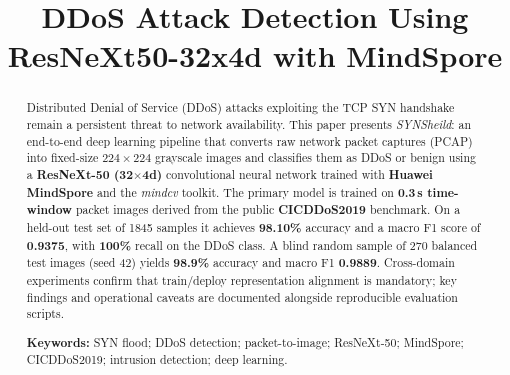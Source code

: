\documentclass[conference]{IEEEtran}
\begin{document}
\title{DDoS Attack Detection Using ResNeXt50-32x4d with MindSpore}

\author{
  \and
  \and
}

\maketitle

\begin{abstract}
Distributed Denial of Service (DDoS) attacks exploiting the TCP SYN handshake
remain a persistent threat to network availability.
This paper presents \textit{SYNSheild}: an end-to-end deep learning pipeline
that converts raw network packet captures (PCAP) into fixed-size $224\times224$
grayscale images and classifies them as DDoS or benign using a
\textbf{ResNeXt-50 (32$\times$4d)} convolutional neural network trained with
\textbf{Huawei MindSpore} and the \textit{mindcv} toolkit.
The primary model is trained on \textbf{0.3\,s time-window} packet images derived
from the public \textbf{CICDDoS2019} benchmark.
On a held-out test set of 1845 samples it achieves \textbf{98.10\%}
accuracy and a macro F1 score of \textbf{0.9375}, with \textbf{100\%} recall on the
DDoS class.
A blind random sample of 270 balanced test images (seed 42) yields
\textbf{98.9\%} accuracy and macro F1 \textbf{0.9889}.
Cross-domain experiments confirm that train/deploy representation alignment is
mandatory; key findings and operational caveats are documented alongside
reproducible evaluation scripts.

\textbf{Keywords:} SYN flood; DDoS detection; packet-to-image; ResNeXt-50;
MindSpore; CICDDoS2019; intrusion detection; deep learning.
\end{abstract}
\end{document}
